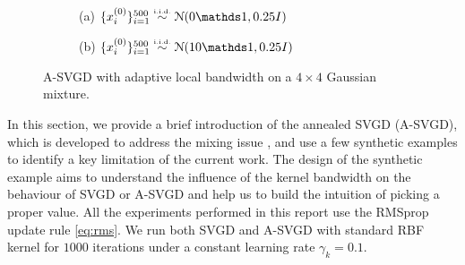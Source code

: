 \captionsetup[subfigure]{labelformat=empty}
\begin{figure}[t!]
    \centering 
\begin{subfigure}[b]{.48\textwidth} 
    \caption{(a) $\{x_i^{(0)}\}_{i = 1}^{500} \distiid \distNorm(0\ind, 0.25I)$  \label{fig:bwlocal}}
\end{subfigure}
\hfill
\centering
\begin{subfigure}[b]{0.48\textwidth}
    \caption{(b) $\{x_i^{(0)}\}_{i = 1}^{500} \distiid \distNorm(10\ind, 0.25I)$ \label{fig:slicelocal}}
\end{subfigure}

\caption{A-SVGD with adaptive local bandwidth on a $4 \times 4$ Gaussian mixture.}
\label{fig:gridlocal}
\end{figure}



In this section, we provide a brief introduction of the annealed SVGD
(A-SVGD), which is developed to address the mixing issue
\citep{d2021annealed}, and use a few synthetic examples to identify a key
limitation of the current work. The design of the synthetic example aims to
understand the influence of the kernel bandwidth on the behaviour of SVGD or
A-SVGD and help us to build the intuition of picking a proper value. All the
experiments performed in this report use the RMSprop update rule
\cref{eq:rms}. We run both SVGD and A-SVGD with standard RBF kernel for
$1000$ iterations under a constant learning rate $\gamma_k = 0.1$.



